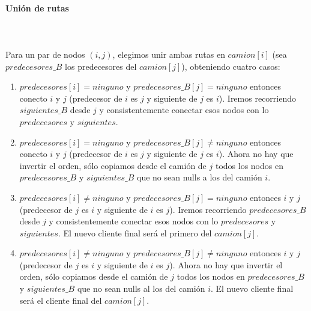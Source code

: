 \paragraph{Unión de rutas} \hspace{0pt} \\
\\
Para un par de nodos $(i,j)$, elegimos unir ambas rutas en $camion[i]$ (sea $predecesores\_B$ los predecesores del $camion[j]$), obteniendo cuatro casos:
\begin{enumerate}
	\item $predecesores[i]=ninguno$  y $predecesores\_B[j] = ninguno$ entonces conecto $i$ y $j$ (predecesor de $i$ es $j$ y siguiente de $j$ es $i$). Iremos recorriendo $siguientes\_B$ desde $j$ y consistentemente conectar esos nodos con lo $predecesores$ y $siguientes$. 
	\item $predecesores[i]=ninguno$  y $predecesores\_B[j] \neq ninguno$ entonces conecto $i$ y $j$ (predecesor de $i$ es $j$ y siguiente de $j$ es $i$). Ahora no hay que invertir el orden, sólo copiamos desde el camión de $j$ todos los nodos en $predecesores\_B$ y $siguientes\_B$ que no sean nulls a los del camión $i$.
	\item $predecesores[i] \neq ninguno$ y $predecesores\_B[j] = ninguno$ entonces  $i$ y $j$ (predecesor de $j$ es $i$ y siguiente de $i$ es $j$). Iremos recorriendo $predecesores\_B$ desde $j$ y consistentemente conectar esos nodos con lo $predecesores$ y $siguientes$. El nuevo cliente final será el primero del $camion[j]$.
	\item $predecesores[i] \neq ninguno$ y $predecesores\_B[j] \neq ninguno$ entonces  $i$ y $j$ (predecesor de $j$ es $i$ y siguiente de $i$ es $j$). Ahora no hay que invertir el orden, sólo copiamos desde el camión de $j$ todos los nodos en $predecesores\_B$ y $siguientes\_B$ que no sean nulls al los del camión $i$. El nuevo cliente final será el cliente final del $camion[j]$.
\end{enumerate}

